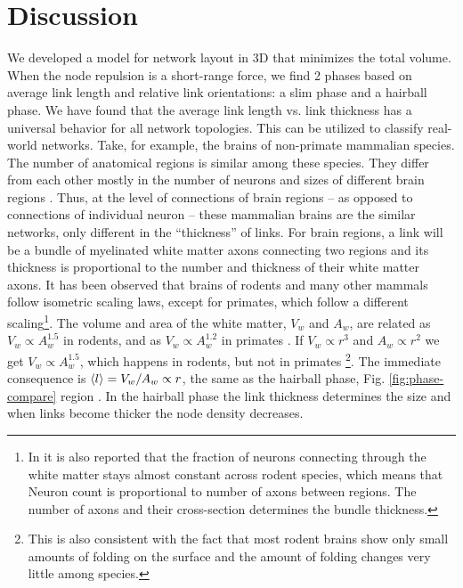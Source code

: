 \documentclass[nofootinbib,preprint,endfloats]{revtex4} %
\newcommand{\RNum}[1]{\uppercase\expandafter{\romannumeral #1\relax}}
\begin{document}
\section{Discussion}
We developed a model for network layout in 3D that minimizes the total volume. 
When the node repulsion is a short-range force, we find 2 phases based on average link length and relative link orientations: a slim phase and a hairball phase. We have found that the average link length vs. link thickness has a universal behavior for all network topologies. This can be utilized to classify real-world networks. Take, for example, the brains of non-primate mammalian species. The number of anatomical regions is similar among these species. They differ from each other mostly in the number of neurons and sizes of different brain regions \cite{azevedo2009equal, herculano2012remarkable, herculano2014brain}. Thus, at the level of connections of brain regions -- as opposed to connections of individual neuron -- these mammalian brains are the similar networks, only different in the ``thickness'' of links. 
For brain regions, a link will be a bundle of myelinated white matter axons connecting two regions and its thickness is proportional to the number and thickness of their white matter axons. 
It has been observed that brains of rodents \cite{herculano2012remarkable} and many other mammals \cite{herculano2014brain} follow isometric scaling laws, except for primates, which follow a different scaling\footnote{In \cite{herculano2012remarkable} it is also reported that the fraction of neurons connecting through the white matter stays almost constant across rodent species, which means that Neuron count is proportional to number of axons between regions. The number of axons and their cross-section determines the bundle thickness.}. 
The volume and area of the white matter, $V_w$ and $A_w$, are related as $V_w\propto A_w^{1.5}$ in rodents, and as $V_w \propto A_w^{1.2}$ in primates  \cite{herculano2012remarkable}. 
If $V_w \propto r^3$ and $A_w \propto r^2$ we get $V_w \propto A_w^{1.5}$, which happens in rodents, but not in primates 
\footnote{This is also consistent with the fact that most rodent brains show only small amounts of folding on the surface and the amount of folding changes very little among species.}.
The immediate consequence is $ \left<l\right> = V_w/A_w \propto r $, the same as the hairball phase, Fig. \ref{fig:phase-compare} region \RNum{3}. 
In the hairball phase the link thickness determines the size and when links become thicker the node density decreases. 
\end{document}
